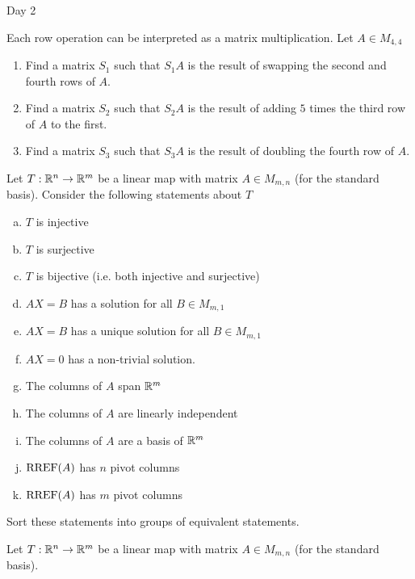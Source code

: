 
\begin{applicationActivities}{Day 2}

\begin{activity}{0}
Each row operation can be interpreted as a matrix multiplication.  Let $A \in M_{4,4}$
\begin{enumerate}[1)]
\item Find a matrix $S_1$ such that $S_1A$ is the result of swapping the second and fourth rows of $A$.
\item Find a matrix $S_2$ such that $S_2A$ is the result of adding $5$ times the third row of $A$ to the first.
\item Find a matrix $S_3$ such that $S_3A$ is the result of doubling the fourth row of $A$.
\end{enumerate}
\end{activity}


\begin{activity}{0}
Let $T: \mathbb{R}^n \rightarrow \mathbb{R}^m$ be a linear map with matrix $A \in M_{m,n}$ (for the standard basis).  Consider the following statements about $T$
\begin{enumerate}[(a)]
\item $T$ is injective
\item $T$ is surjective
\item $T$ is bijective (i.e. both injective and surjective)
\item $AX=B$ has a solution for all $B \in M_{m,1}$
\item $AX=B$ has a unique solution for all $B \in M_{m,1}$
\item $AX=0$ has a non-trivial solution.
\item The columns of $A$ span $\mathbb{R}^m$
\item The columns of $A$ are linearly independent
\item The columns of $A$ are a basis of $\mathbb{R}^m$
\item $\operatorname{RREF}(A)$ has $n$ pivot columns
\item $\operatorname{RREF}(A)$ has $m$ pivot columns
\end{enumerate}

Sort these statements into groups of equivalent statements.

\end{activity}

\begin{activity}{0}
Let $T: \mathbb{R}^n \rightarrow \mathbb{R}^m$ be a linear map with matrix $A \in M_{m,n}$ (for the standard basis).


\end{activity}
\end{applicationActivities}
